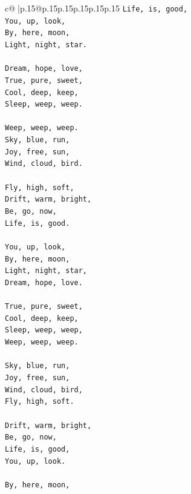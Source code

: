 \documentclass{article}
\begin{document}
{\begin{supertabular}{c@{$\;$}|p{.15\linewidth}@{}p{.15\linewidth}p{.15\linewidth}p{.15\linewidth}p{.15\linewidth}p{.15\linewidth}}
{{{\texttt{Life, is, good,} \\
\texttt{You, up, look,} \\
\texttt{By, here, moon,} \\
\texttt{Light, night, star.} \\
\\ 
\texttt{Dream, hope, love,} \\
\texttt{True, pure, sweet,} \\
\texttt{Cool, deep, keep,} \\
\texttt{Sleep, weep, weep.} \\
\\ 
\texttt{Weep, weep, weep.} \\
\texttt{Sky, blue, run,} \\
\texttt{Joy, free, sun,} \\
\texttt{Wind, cloud, bird.} \\
\\ 
\texttt{Fly, high, soft,} \\
\texttt{Drift, warm, bright,} \\
\texttt{Be, go, now,} \\
\texttt{Life, is, good.} \\
\\ 
\texttt{You, up, look,} \\
\texttt{By, here, moon,} \\
\texttt{Light, night, star,} \\
\texttt{Dream, hope, love.} \\
\\ 
\texttt{True, pure, sweet,} \\
\texttt{Cool, deep, keep,} \\
\texttt{Sleep, weep, weep,} \\
\texttt{Weep, weep, weep.} \\
\\ 
\texttt{Sky, blue, run,} \\
\texttt{Joy, free, sun,} \\
\texttt{Wind, cloud, bird,} \\
\texttt{Fly, high, soft.} \\
\\ 
\texttt{Drift, warm, bright,} \\
\texttt{Be, go, now,} \\
\texttt{Life, is, good,} \\
\texttt{You, up, look.} \\
\\ 
\texttt{By, here, moon,} \\
}}}
\end{supertabular}}
\end{document}
